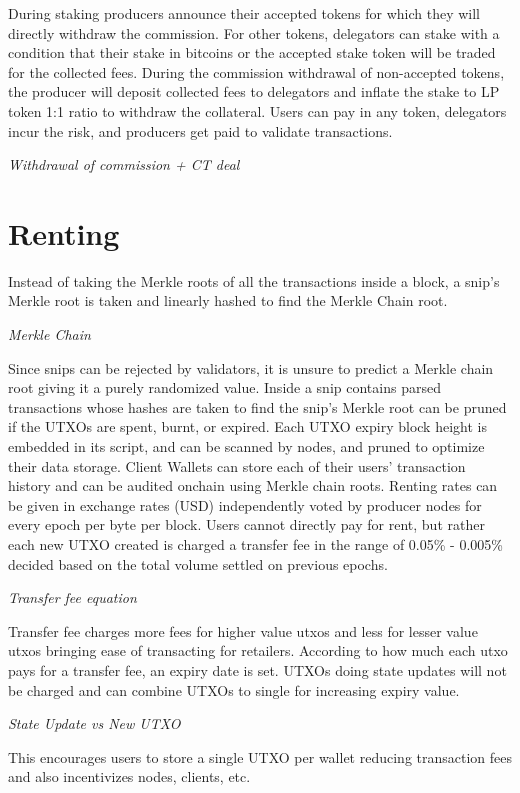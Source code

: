 \documentclass[a4paper,10pt]{article}
\begin{document}
During staking producers announce their accepted tokens for which they will directly withdraw the commission. For other tokens, delegators can stake with a condition that their stake in bitcoins or the accepted stake token will be traded for the collected fees. During the commission withdrawal of non-accepted tokens, the producer will deposit collected fees to delegators and inflate the stake to LP token 1:1 ratio to withdraw the collateral. Users can pay in any token, delegators incur the risk, and producers get paid to validate transactions.

\textit{Withdrawal of commission + CT deal}


\section{Renting}
Instead of taking the Merkle roots of all the transactions inside a block, a snip's Merkle root is taken and linearly hashed to find the Merkle Chain root. 

\textit{Merkle Chain}

Since snips can be rejected by validators, it is unsure to predict a Merkle chain root giving it a purely randomized value. Inside a snip contains parsed transactions whose hashes are taken to find the snip's Merkle root can be pruned if the UTXOs are spent, burnt, or expired. Each UTXO expiry block height is embedded in its script, and can be scanned by nodes, and pruned to optimize their data storage. Client Wallets can store each of their users' transaction history and can be audited onchain using Merkle chain roots. Renting rates can be given in exchange rates (USD) independently voted by producer nodes for every epoch per byte per block. Users cannot directly pay for rent, but rather each new UTXO created is charged a transfer fee in the range of 0.05\% - 0.005\% decided based on the total volume settled on previous epochs.

\textit{Transfer fee equation}

 Transfer fee charges more fees for higher value utxos and less for lesser value utxos bringing ease of transacting for retailers. According to how much each utxo pays for a transfer fee, an expiry date is set. UTXOs doing state updates will not be charged and can combine UTXOs to single for increasing expiry value. 
 
\textit{State Update vs New UTXO} 
  
 This encourages users to store a single UTXO per wallet reducing transaction fees and also incentivizes nodes, clients, etc.  
\end{document}
